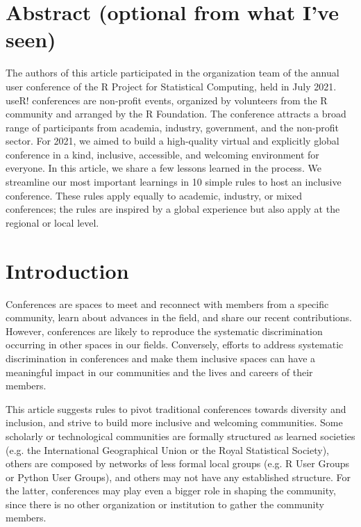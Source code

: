 \documentclass[10pt,letterpaper]{article}
\begin{document}
\section*{Abstract (optional from what I've seen)}

The authors of this article participated in the organization team of the annual user conference of the R Project for Statistical Computing, held in July 2021. useR! conferences are non-profit events, organized by volunteers from the R community and arranged by the R Foundation. The conference attracts a broad range of participants from academia, industry, government, and the non-profit sector. For 2021, we aimed to build a high-quality virtual and explicitly global conference in a kind, inclusive, accessible, and welcoming environment for everyone. 
In this article, we share a few lessons learned in the process. We streamline our most important learnings in 10 simple rules to host an inclusive conference. These rules apply equally to academic, industry, or mixed conferences; the rules are inspired by a global experience but also apply at the regional or local level.





\linenumbers

\section*{Introduction}

Conferences are spaces to meet and reconnect with members from a specific community, learn about advances in the field, and share our recent contributions. 
However, conferences are likely to reproduce the systematic discrimination occurring in other spaces in our fields.
Conversely, efforts to address systematic discrimination in conferences and make them inclusive spaces can have a meaningful impact in our communities and the lives and careers of their members. 

This article suggests rules to pivot traditional conferences towards diversity and inclusion, and strive to build more inclusive and welcoming communities. 
Some scholarly or technological communities are formally structured as learned societies (e.g. the International Geographical Union or the Royal Statistical Society), others are composed by networks of less formal local groups (e.g. R User Groups or Python User Groups), and others may not have any established structure. 
For the latter, conferences may play even a bigger role in shaping the community, since there is no other organization or institution to gather the community members. 
\end{document}
